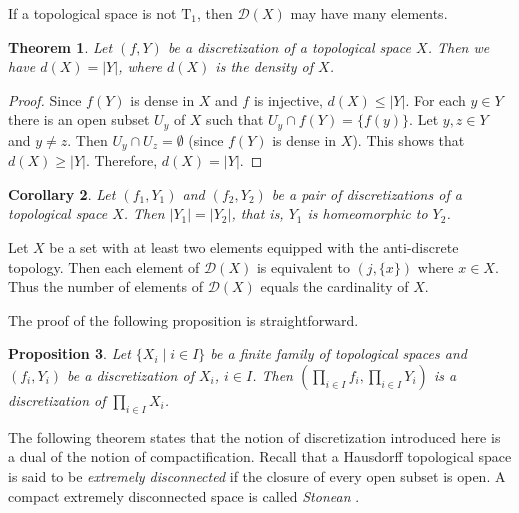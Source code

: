 \documentclass[manuscript]{amsart}
\newtheorem{theorem}{Theorem}[section]
\newtheorem{corollary}[theorem]{Corollary}
\newtheorem{proposition}[theorem]{Proposition}
\theoremstyle{definition}
\begin{document}
If a topological space is not $\mathrm{T}_{1}$, then $\mathcal{D}(X)$
may have many elements.

\begin{theorem}
Let $(f,Y)$ be a discretization of a topological space $X$. Then we have
$d(X)=|Y|$, where $d(X)$ is the density of $X$.
\end{theorem}
\begin{proof}
Since $f(Y)$ is dense in $X$ and $f$ is injective, $d(X)\leq |Y|$. For each $y\in Y$ there
is an open subset $U_{y}$ of $X$ such that $U_{y}\cap f(Y)=\{f(y)\}$. Let $y,z\in Y$ and
$y\neq z$. Then $U_{y}\cap U_{z}=\emptyset$ (since $f(Y)$ is dense in $X$).
This shows that $d(X)\geq |Y|$. Therefore, $d(X)=|Y|$.
\end{proof}
\begin{corollary}
Let $(f_{1},Y_{1})$ and $(f_{2},Y_{2})$ be a pair of discretizations of a topological space $X$.
Then $|Y_{1}|=|Y_{2}|$, that is, $Y_{1}$ is homeomorphic to $Y_{2}$.
\end{corollary}

Let $X$ be a set with at least two elements equipped with the anti-discrete topology. Then each element of $\mathcal{D}(X)$
is equivalent to $(j,\{x\})$ where $x\in X$. Thus the number of elements of $\mathcal{D}(X)$
equals the cardinality of $X$.

The proof of the following proposition is straightforward.

\begin{proposition}\label{proprod}
Let $\{X_{i}\mid i\in I\}$ be a finite family of topological spaces and
$(f_{i},Y_{i})$ be a discretization of $X_{i}$, $i\in I$.
Then $(\prod_{i\in I} f_{i},\prod_{i\in I} Y_{i})$ is a discretization of
$\prod_{i\in I} X_{i}$.
\end{proposition}

The following theorem states that the notion of discretization introduced here
is a dual of the notion of compactification.
Recall that a Hausdorff topological space is said to be
\emph{extremely disconnected} if the closure of every open subset is open.
A compact extremely disconnected space is called \emph{Stonean} \cite[Definition~III.1.6]{ta79}.
\end{document}
